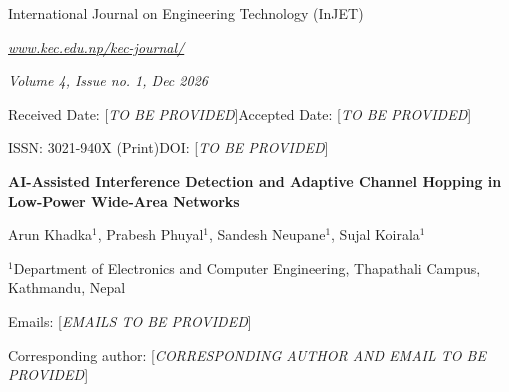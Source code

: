 \documentclass[10pt,a4paper]{article}
\newcommand{\placeholder}[1]{[\textit{#1}]}
\begin{document}
\thispagestyle{firstpage}

\begin{center}
{\fontsize{10}{12}\selectfont International Journal on Engineering Technology (InJET)\par}
{\fontsize{9}{11}\selectfont\itshape \url{www.kec.edu.np/kec-journal/}\par}
{\fontsize{9}{11}\selectfont\itshape Volume 4, Issue no. 1, Dec 2026\par}
{\fontsize{8}{10}\selectfont Received Date: \placeholder{TO BE PROVIDED}\qquad Accepted Date: \placeholder{TO BE PROVIDED}\par}
{\fontsize{8}{10}\selectfont ISSN: 3021-940X (Print)\qquad DOI: \placeholder{TO BE PROVIDED}\par}
\vspace{5pt}
{\fontsize{17}{20}\selectfont\bfseries AI-Assisted Interference Detection and Adaptive Channel Hopping in Low-Power Wide-Area Networks\par}
\vspace{7pt}
{\fontsize{13}{15}\selectfont Arun Khadka$^{1}$, Prabesh Phuyal$^{1}$, Sandesh Neupane$^{1}$, Sujal Koirala$^{1}$\par}
\vspace{4pt}
{\fontsize{8}{10}\selectfont $^{1}$Department of Electronics and Computer Engineering, Thapathali Campus, Kathmandu, Nepal\par}
{\fontsize{8}{10}\selectfont Emails: \placeholder{EMAILS TO BE PROVIDED}\par}
{\fontsize{8}{10}\selectfont * Corresponding author: \placeholder{CORRESPONDING AUTHOR AND EMAIL TO BE PROVIDED}\par}
\end{center}
\end{document}
